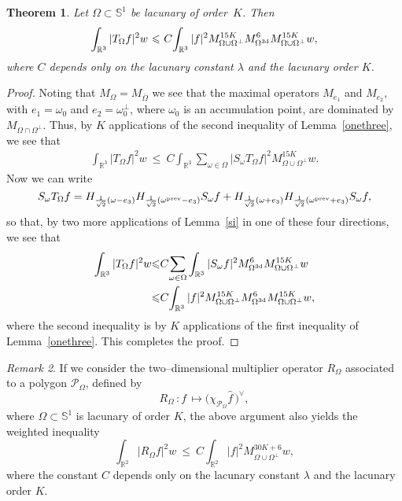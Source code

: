 \documentclass[11pt]{amsart}
\newtheorem{theorem}{Theorem}[section]
\theoremstyle{definition}
\theoremstyle{remark}
\newtheorem{rem}[theorem]{Remark}
\begin{document}
\begin{theorem}\label{thetheorem2} Let $\Omega\subset \mathbb{S}^1$ be lacunary of order~$K$. Then
$$
\int_{\mathbb{R}^3} |T_{\Omega}f|^2 w\ {\leqslant} \  C\! \int_{\mathbb{R}^3}  |f|^2 M^{15K}_{\Omega\cup\Omega^\perp}M^6_{\Omega^{\rm 3d}}M^{15K}_{\Omega\cup\Omega^\perp}w,
$$
where $C$ depends only on the lacunary constant ${\lambda}$ and the lacunary order $K$.
\end{theorem}

\begin{proof} Noting that $M_{\Omega}=M_{\overline{\Omega}}$ we see that the maximal operators $M_{e_1}$ and $M_{e_2}$,  with $e_1=\omega_0$ and $e_2=\omega_0^\perp$, where $\omega_0$ is an accumulation point, are dominated by $M_{\Omega\cap\Omega^\perp}$. Thus, by $K$ applications of the second inequality of Lemma~\ref{onethree}, we see that
\begin{align*}
\int_{\mathbb{R}^3} |T_{\Omega}f|^2 w\ {\leqslant} \  C\!\int_{\mathbb{R}^3} \sum_{\omega\in\Omega}|S_\omega T_{\Omega}f|^2 M^{15K}_{\Omega\cup\Omega^\perp} w.
\end{align*}
Now we can write
$$
S_\omega T_{\Omega}f=H_{\frac{1}{\sqrt{2}}(\omega-e_3)} H_{\frac{1}{\sqrt{2}}(\omega^{\rm prev}-e_3)}S_\omega f+H_{\frac{1}{\sqrt{2}}(\omega+e_3)} H_{\frac{1}{\sqrt{2}}(\omega^{\rm prev}+e_3)}S_\omega f,
$$ so that, by two more applications of Lemma~\ref{si} in one of these four directions, we see that
\begin{align*}
\int_{\mathbb{R}^3} |T_{\Omega}f|^2 w&{\leqslant} C\!\sum_{\omega\in\Omega}\int_{\mathbb{R}^3} |S_\omega f|^2 M^6_{\Omega^{\rm 3d}}M^{15K}_{\Omega\cup\Omega^\perp}w\\
&{\leqslant} C\!\int_{\mathbb{R}^3} |f|^2
M^{15K}_{\Omega\cup\Omega^\perp}M^6_{\Omega^{\rm
3d}}M^{15K}_{\Omega\cup\Omega^\perp}w,
\end{align*}
where the second inequality is by $K$ applications of the first inequality of Lemma~\ref{onethree}. This completes the proof.
\end{proof}

\begin{rem} If we consider the two--dimensional multiplier operator $R_{\Omega}$ associated to a polygon $\mathcal{P}_\Omega$, defined by
$$
R_{\Omega}\,:f\,\mapsto\Big(\chi_{\mathcal{P}_\Omega} \widehat{f}\,\Big)^\vee,
$$
where $\Omega\subset \mathbb{S}^1$ is lacunary of order $K$, the above argument also yields the weighted inequality
$$
\int_{\mathbb{R}^2} |R_{\Omega}f|^2 w\ {\leqslant} \  C\! \int_{\mathbb{R}^2}  |f|^2 M^{30K+6}_{\Omega\cup\Omega^\perp}w,
$$
where the constant $C$ depends only on the lacunary constant ${\lambda}$ and the lacunary order $K$.
\end{rem}
\end{document}
